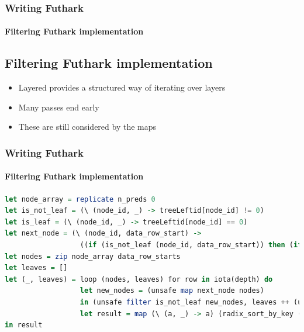 \documentclass[12pt,t]{beamer}
\begin{document}
\begin{frame}
  \frametitle{Writing Futhark}
  \framesubtitle{Filtering Futhark implementation}
\subsection{Filtering Futhark implementation}

\begin{itemize}
  \item Layered provides a structured way of iterating over layers
  \item Many passes end early
  \item These are still considered by the maps
\end{itemize}

\end{frame}
\begin{frame}[fragile]
\frametitle{Writing Futhark}
\framesubtitle{Filtering Futhark implementation}
\begin{minipage}{\textwidth}
\begin{lstlisting}[basicstyle=\tiny, language=Haskell, breaklines]
let node_array = replicate n_preds 0
let is_not_leaf = (\ (node_id, _) -> treeLeftid[node_id] != 0)
let is_leaf = (\ (node_id, _) -> treeLeftid[node_id] == 0)
let next_node = (\ (node_id, data_row_start) ->
                  ((if (is_not_leaf (node_id, data_row_start)) then (if Xtest[data_row_start + treeFeature[node_id]] <= treeThres_or_leaf[node_id] then treeLeftid[node_id] else treeRightid[node_id]) else node_id), data_row_start))
let nodes = zip node_array data_row_starts
let leaves = []
let (_, leaves) = loop (nodes, leaves) for row in iota(depth) do
                  let new_nodes = (unsafe map next_node nodes)
                  in (unsafe filter is_not_leaf new_nodes, leaves ++ (unsafe filter is_leaf new_nodes))
                  let result = map (\ (a, _) -> a) (radix_sort_by_key (\ (_, a) -> a) i32.num_bits i32.get_bit leaves)
in result
\end{lstlisting}
\end{minipage}




\end{frame}
\end{document}
